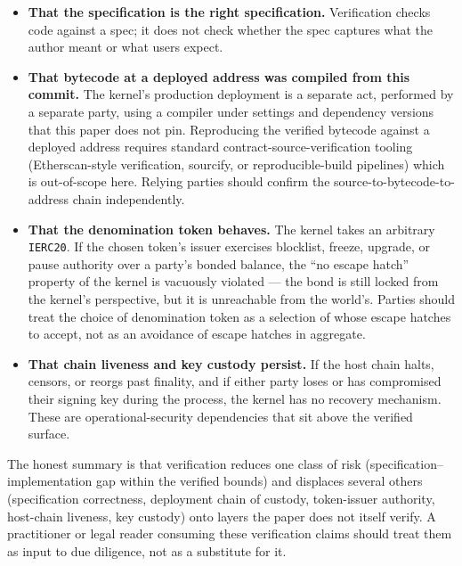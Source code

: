 \documentclass[11pt,a4paper]{article}
\theoremstyle{definition}
\theoremstyle{remark}
\begin{document}
\begin{itemize}
  \item \textbf{That the specification is the right specification.}
    Verification checks code against a spec; it does not check
    whether the spec captures what the author meant or what users
    expect.
  \item \textbf{That bytecode at a deployed address was compiled
    from this commit.} The kernel's production deployment is a
    separate act, performed by a separate party, using a compiler
    under settings and dependency versions that this paper does
    not pin. Reproducing the verified bytecode against a deployed
    address requires standard contract-source-verification
    tooling (Etherscan-style verification, sourcify, or
    reproducible-build pipelines) which is out-of-scope here.
    Relying parties should confirm the source-to-bytecode-to-address
    chain independently.
  \item \textbf{That the denomination token behaves.} The kernel
    takes an arbitrary \texttt{IERC20}. If the chosen token's
    issuer exercises blocklist, freeze, upgrade, or pause
    authority over a party's bonded balance, the ``no escape
    hatch'' property of the kernel is vacuously violated --- the
    bond is still locked from the kernel's perspective, but it
    is unreachable from the world's. Parties should treat the
    choice of denomination token as a selection of whose escape
    hatches to accept, not as an avoidance of escape hatches in
    aggregate.
  \item \textbf{That chain liveness and key custody persist.} If
    the host chain halts, censors, or reorgs past finality, and
    if either party loses or has compromised their signing key
    during the process, the kernel has no recovery mechanism.
    These are operational-security dependencies that sit above
    the verified surface.
\end{itemize}

The honest summary is that verification reduces one class of risk
(specification--implementation gap within the verified bounds) and
displaces several others (specification correctness, deployment
chain of custody, token-issuer authority, host-chain liveness, key
custody) onto layers the paper does not itself verify. A
practitioner or legal reader consuming these verification claims
should treat them as input to due diligence, not as a substitute
for it.

\end{document}
